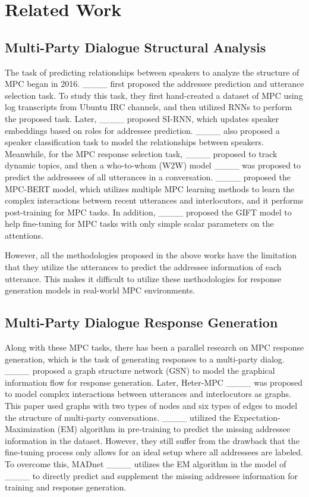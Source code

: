 \section{Related Work}
\subsection{Multi-Party Dialogue Structural Analysis}
The task of predicting relationships between speakers to analyze the structure of MPC began in 2016. ____ first proposed the addressee prediction and utterance selection task. To study this task, they first hand-created a dataset of MPC using log transcripts from Ubuntu IRC channels, and then utilized RNNs to perform the proposed task. Later, ____ proposed SI-RNN, which updates speaker embeddings based on roles for addressee prediction. ____ also proposed a speaker classification task to model the relationships between speakers. Meanwhile, for the MPC response selection task, ____ proposed to track dynamic topics, and then a who-to-whom (W2W) model ____ was proposed to predict the addressees of all utterances in a conversation. ____ proposed the MPC-BERT model, which utilizes multiple MPC learning methods to learn the complex interactions between recent utterances and interlocutors, and it performs post-training for MPC tasks. In addition, ____ proposed the GIFT model to help fine-tuning for MPC tasks with only simple scalar parameters on the attentions.

However, all the methodologies proposed in the above works have the limitation that they utilize the utterances to predict the addressee information of each utterance. This makes it difficult to utilize these methodologies for response generation models in real-world MPC environments.

\subsection{Multi-Party Dialogue Response Generation}
Along with these MPC tasks, there has been a parallel research on MPC response generation, which is the task of generating responses to a multi-party dialog. ____ proposed a graph structure network (GSN) to model the graphical information flow for response generation. Later, Heter-MPC ____ was proposed to model complex interactions between utterances and interlocutors as graphs. This paper used graphs with two types of nodes and six types of edges to model the structure of multi-party conversations. ____ utilized the Expectation-Maximization (EM) algorithm in pre-training to predict the missing addressee information in the dataset. However, they still suffer from the drawback that the fine-tuning process only allows for an ideal setup where all addressees are labeled. To overcome this, MADnet ____ utilizes the EM algorithm in the model of ____ to directly predict and supplement the missing addressee information for training and response generation.

